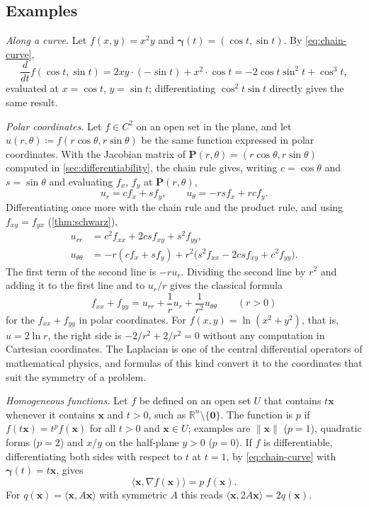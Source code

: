 \subsection{Examples}

\emph{Along a curve.} Let $f(x,y)=x^2y$ and $\boldsymbol\gamma(t)=(\cos t,\sin t)$. By \eqref{eq:chain-curve},
\[
\frac d{dt}f(\cos t,\sin t)=2xy\cdot(-\sin t)+x^2\cdot\cos t=-2\cos t\sin^2t+\cos^3t ,
\]
evaluated at $x=\cos t$, $y=\sin t$; differentiating $\cos^2t\sin t$ directly gives the same result.

\emph{Polar coordinates.} Let $f\in C^2$ on an open set in the plane, and let $u(r,\theta)\coloneqq f(r\cos\theta,r\sin\theta)$ be the same function expressed in polar coordinates. With the Jacobian matrix of $\mathbf P(r,\theta)=(r\cos\theta,r\sin\theta)$ computed in \cref{sec:differentiability}, the chain rule gives, writing $c=\cos\theta$ and $s=\sin\theta$ and evaluating $f_x$, $f_y$ at $\mathbf P(r,\theta)$,
\[
u_r=cf_x+sf_y,\qquad u_\theta=-rsf_x+rcf_y .
\]
Differentiating once more with the chain rule and the product rule, and using $f_{xy}=f_{yx}$ (\cref{thm:schwarz}),
\begin{align*}
u_{rr}&=c^2f_{xx}+2csf_{xy}+s^2f_{yy},\\
u_{\theta\theta}&=-r(cf_x+sf_y)+r^2\bigl(s^2f_{xx}-2csf_{xy}+c^2f_{yy}\bigr).
\end{align*}
The first term of the second line is $-ru_r$. Dividing the second line by $r^2$ and adding it to the first line and to $u_r/r$ gives the classical formula
\[
f_{xx}+f_{yy}=u_{rr}+\frac1ru_r+\frac1{r^2}u_{\theta\theta}\qquad(r>0)
\]
for the  $f_{xx}+f_{yy}$ in polar coordinates. For $f(x,y)=\ln(x^2+y^2)$, that is, $u=2\ln r$, the right side is $-2/r^2+2/r^2=0$ without any computation in Cartesian coordinates. The Laplacian is one of the central differential operators of mathematical physics, and formulas of this kind convert it to the coordinates that suit the symmetry of a problem.

\emph{Homogeneous functions.} Let $f$ be defined on an open set $U$ that contains $t\mathbf x$ whenever it contains $\mathbf x$ and $t>0$, such as $\mathbb R^n\setminus\{\mathbf0\}$. The function is  $p$ if $f(t\mathbf x)=t^pf(\mathbf x)$ for all $t>0$ and $\mathbf x\in U$; examples are $\|\mathbf x\|$ ($p=1$), quadratic forms ($p=2$) and $x/y$ on the half-plane $y>0$ ($p=0$). If $f$ is differentiable, differentiating both sides with respect to $t$ at $t=1$, by \eqref{eq:chain-curve} with $\boldsymbol\gamma(t)=t\mathbf x$, gives 
\[
\langle\mathbf x,\nabla f(\mathbf x)\rangle=p\,f(\mathbf x).
\]
For $q(\mathbf x)=\langle\mathbf x,A\mathbf x\rangle$ with symmetric $A$ this reads $\langle\mathbf x,2A\mathbf x\rangle=2q(\mathbf x)$.

